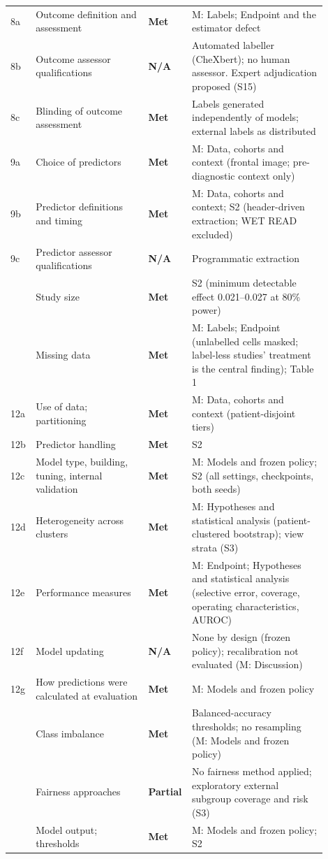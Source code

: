 \documentclass[9pt,a4paper]{extarticle}
\newcommand{\met}{\textbf{Met}}
\newcommand{\partl}{\textbf{Partial}}
\newcommand{\na}{\textbf{N/A}}
\begin{document}
\begin{longtable}{>{\raggedright\arraybackslash}p{0.05\linewidth}>{\raggedright\arraybackslash}p{0.35\linewidth}>{\raggedright\arraybackslash}p{0.08\linewidth}>{\raggedright\arraybackslash}p{0.42\linewidth}}
8a & Outcome definition and assessment & \met & M: Labels; Endpoint and the estimator defect\\
8b & Outcome assessor qualifications & \na & Automated labeller (CheXbert); no human assessor. Expert adjudication proposed (S15)\\
8c & Blinding of outcome assessment & \met & Labels generated independently of models; external labels as distributed\\
9a & Choice of predictors & \met & M: Data, cohorts and context (frontal image; pre-diagnostic context only)\\
9b & Predictor definitions and timing & \met & M: Data, cohorts and context; S2 (header-driven extraction; WET READ excluded)\\
9c & Predictor assessor qualifications & \na & Programmatic extraction\\
10 & Study size & \met & S2 (minimum detectable effect 0.021--0.027 at 80\% power)\\
11 & Missing data & \met & M: Labels; Endpoint (unlabelled cells masked; label-less studies' treatment is the central finding); Table 1\\
12a & Use of data; partitioning & \met & M: Data, cohorts and context (patient-disjoint tiers)\\
12b & Predictor handling & \met & S2\\
12c & Model type, building, tuning, internal validation & \met & M: Models and frozen policy; S2 (all settings, checkpoints, both seeds)\\
12d & Heterogeneity across clusters & \met & M: Hypotheses and statistical analysis (patient-clustered bootstrap); view strata (S3)\\
12e & Performance measures & \met & M: Endpoint; Hypotheses and statistical analysis (selective error, coverage, operating characteristics, AUROC)\\
12f & Model updating & \na & None by design (frozen policy); recalibration not evaluated (M: Discussion)\\
12g & How predictions were calculated at evaluation & \met & M: Models and frozen policy\\
13 & Class imbalance & \met & Balanced-accuracy thresholds; no resampling (M: Models and frozen policy)\\
14 & Fairness approaches & \partl & No fairness method applied; exploratory external subgroup coverage and risk (S3)\\
15 & Model output; thresholds & \met & M: Models and frozen policy; S2\\

\end{longtable}
\end{document}
